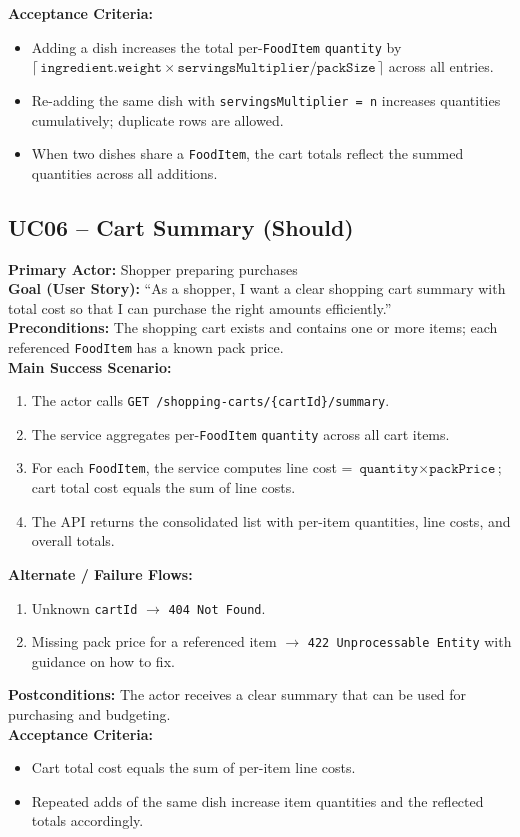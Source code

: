 \documentclass[11pt]{article}
\begin{document}
\textbf{Acceptance Criteria:}
\begin{itemize}[noitemsep]
  \item Adding a dish increases the total per-\texttt{FoodItem} \texttt{quantity} by \(\lceil\,\texttt{ingredient.weight} \times \texttt{servingsMultiplier} / \texttt{packSize}\,\rceil\) across all entries.
  \item Re-adding the same dish with \texttt{servingsMultiplier = n} increases quantities cumulatively; duplicate rows are allowed.
  \item When two dishes share a \texttt{FoodItem}, the cart totals reflect the summed quantities across all additions.
\end{itemize}

\subsection*{UC06 -- Cart Summary (Should)}
\textbf{Primary Actor:} Shopper preparing purchases\\
\textbf{Goal (User Story):} ``As a shopper, I want a clear shopping cart summary with total cost so that I can purchase the right amounts efficiently.''\\
\textbf{Preconditions:} The shopping cart exists and contains one or more items; each referenced \texttt{FoodItem} has a known pack price.\\
\textbf{Main Success Scenario:}
\begin{enumerate}[label=\arabic*.]
  \item The actor calls \texttt{GET /shopping-carts/\{cartId\}/summary}.
  \item The service aggregates per-\texttt{FoodItem} \texttt{quantity} across all cart items.
  \item For each \texttt{FoodItem}, the service computes line cost = \(\texttt{quantity} \times \texttt{packPrice}\); cart total cost equals the sum of line costs.
  \item The API returns the consolidated list with per-item quantities, line costs, and overall totals.
\end{enumerate}
\textbf{Alternate / Failure Flows:}
\begin{enumerate}[label=\arabic*F.]
  \item Unknown \texttt{cartId} $\rightarrow$ \texttt{404 Not Found}.
  \item Missing pack price for a referenced item $\rightarrow$ \texttt{422 Unprocessable Entity} with guidance on how to fix.
\end{enumerate}
\textbf{Postconditions:} The actor receives a clear summary that can be used for purchasing and budgeting.\\
\textbf{Acceptance Criteria:}
\begin{itemize}[noitemsep]
  \item Cart total cost equals the sum of per-item line costs.
  \item Repeated adds of the same dish increase item quantities and the reflected totals accordingly.
\end{itemize}
\end{document}
